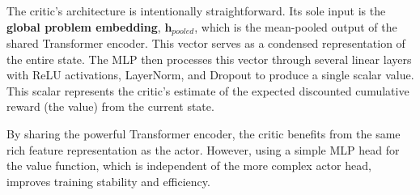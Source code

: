 The critic's architecture is intentionally straightforward. Its sole input is the \textbf{global problem embedding}, \(\mathbf{h}_{pooled}\), which is the mean-pooled output of the shared Transformer encoder. This vector serves as a condensed representation of the entire state. The MLP then processes this vector through several linear layers with ReLU activations, LayerNorm, and Dropout to produce a single scalar value. This scalar represents the critic's estimate of the expected discounted cumulative reward (the value) from the current state.

By sharing the powerful Transformer encoder, the critic benefits from the same rich feature representation as the actor. However, using a simple MLP head for the value function, which is independent of the more complex actor head, improves training stability and efficiency.

